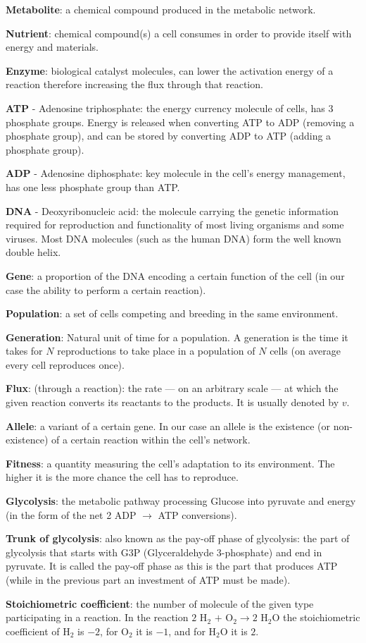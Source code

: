 \documentclass[a4paper,12pt]{article}
\begin{document}
	\begin{framed}

		\textbf{Metabolite}: a chemical compound produced in the metabolic network. 

		\textbf{Nutrient}: chemical compound(s) a cell consumes in order to provide itself with energy and materials.

		\textbf{Enzyme}: biological catalyst molecules, can lower the activation energy of a reaction therefore increasing the flux through that reaction. 

	\textbf{ATP} - Adenosine triphosphate: the energy currency molecule of cells, has 3 phosphate groups. Energy is released when converting ATP to ADP (removing a phosphate group), and can be stored by converting ADP to ATP (adding a phosphate group).

	\textbf{ADP} - Adenosine diphosphate: key molecule in the cell's energy management, has one less phosphate group than ATP.

	\textbf{DNA} - Deoxyribonucleic acid: the molecule carrying the genetic information required for reproduction and functionality of most living organisms and some viruses. Most DNA molecules (such as the human DNA) form the well known double helix. 

	\textbf{Gene}: a proportion of the DNA encoding a certain function of the cell (in our case the ability to perform a certain reaction). 

	\textbf{Population}: a set of cells competing and breeding in the same environment.

	\textbf{Generation}: Natural unit of time for a population. A generation is the time it takes for $N$ reproductions to take place in a population of $N$ cells (on average every cell reproduces once).

	\textbf{Flux}: (through a reaction): the rate ---  on an arbitrary scale --- at which the given reaction converts its reactants to the products. It is usually denoted by $v$. 

	\textbf{Allele}: a variant of a certain gene. In our case an allele is the existence (or non-existence) of a certain reaction within the cell's network.

	\textbf{Fitness}: a quantity measuring the cell's adaptation to its environment. The higher it is the more chance the cell has to reproduce.

	\textbf{Glycolysis}: the metabolic pathway processing Glucose into pyruvate and energy (in the form of the net 2 ADP $\rightarrow$ ATP conversions).

	\textbf{Trunk of glycolysis}: also known as the pay-off phase of glycolysis: the part of glycolysis that starts with G3P (Glyceraldehyde 3-phosphate) and end in pyruvate. It is called the pay-off phase as this is the part that produces ATP (while in the previous part an investment of ATP must be made).
	
	\textbf{Stoichiometric coefficient}: the number of molecule of the given type participating in a reaction. In the reaction $2$ H$_2$ $+$ O$_2 \rightarrow 2$ H$_2$O the stoichiometric coefficient of H$_2$ is $-2$, for O$_2$ it is $-1$, and for H$_2$O it is $2$. 

	\end{framed}
\end{document}
